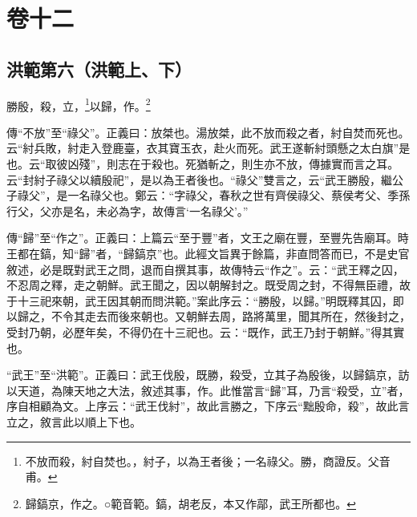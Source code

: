 

\chapter{卷十二}


\section{洪範第六（洪範上、下）}


勝殷，殺，立，\footnote{不放而殺，紂自焚也。，紂子，以為王者後；一名祿父。勝，商證反。父音甫。}以歸，作。\footnote{歸鎬京，作之。○範音範。鎬，胡老反，本又作鄗，武王所都也。}

{\noindent\zhuan{}\fzbyks 傳“不放”至“祿父”。正義曰：放桀也。湯放桀，此不放而殺之者，紂自焚而死也。云“紂兵敗，紂走入登鹿臺，衣其寶玉衣，赴火而死。武王遂斬紂頭懸之太白旗”是也。云“取彼凶殘”，則志在于殺也。死猶斬之，則生亦不放，傳據實而言之耳。云“封紂子祿父以續殷祀”，是以為王者後也。“祿父”雙言之，云“武王勝殷，繼公子祿父”，是一名祿父也。鄭云：“字祿父，春秋之世有齊侯祿父、蔡侯考父、季孫行父，父亦是名，未必為字，故傳言‘一名祿父’。” \par}

{\noindent\zhuan{}\fzbyks 傳“歸”至“作之”。正義曰：上篇云“至于豐”者，文王之廟在豐，至豐先告廟耳。時王都在鎬，知“歸”者，“歸鎬京”也。此經文旨異于餘篇，非直問答而已，不是史官敘述，必是既對武王之問，退而自撰其事，故傳特云“作之”。云：“武王釋之囚，不忍周之釋，走之朝鮮。武王聞之，因以朝解封之。既受周之封，不得無臣禮，故于十三祀來朝，武王因其朝而問洪範。”案此序云：“勝殷，以歸。”明既釋其囚，即以歸之，不令其走去而後來朝也。又朝鮮去周，路將萬里，聞其所在，然後封之，受封乃朝，必歷年矣，不得仍在十三祀也。云：“既作，武王乃封于朝鮮。”得其實也。 \par}

{\noindent\shu{}\fzkt “武王”至“洪範”。正義曰：武王伐殷，既勝，殺受，立其子為殷後，以歸鎬京，訪以天道，為陳天地之大法，敘述其事，作。此惟當言“歸”耳，乃言“殺受，立”者，序自相顧為文。上序云：“武王伐紂”，故此言勝之，下序云“黜殷命，殺”，故此言立之，敘言此以順上下也。 \par}

